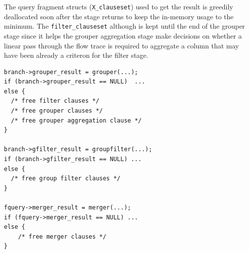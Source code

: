 The query fragment structs (\texttt{X\_clauseset}) used to get the result is
greedily deallocated soon after the stage returns to keep the in-memory usage
to the minimum. The \texttt{filter\_clauseset}  although is kept until the end of the grouper stage since it
helps the grouper aggregation stage make decisions on whether a linear pass
through the flow trace is required to aggregate a column that may have been
already a criteron for the filter stage.

\begin{lstlisting}
branch->grouper_result = grouper(...);
if (branch->grouper_result == NULL)  ...
else {
  /* free filter clauses */
  /* free grouper clauses */
  /* free grouper aggregation clause */
}

branch->gfilter_result = groupfilter(...);
if (branch->gfilter_result == NULL) ...
else {
  /* free group filter clauses */
}

fquery->merger_result = merger(...);
if (fquery->merger_result == NULL) ...
else {
    /* free merger clauses */
}
\end{lstlisting}

